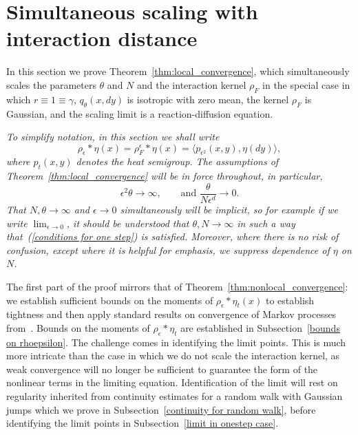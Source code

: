 \documentclass[12pt]{article}
\numberwithin{equation}{section}
\begin{document}
\section{Simultaneous scaling with interaction distance}
\label{subsec:one step convergence proof}

In this section we prove Theorem~\ref{thm:local_convergence},
which simultaneously scales the parameters $\theta$ and $N$ and the interaction 
kernel $\rho_F$ in the special case in which $r\equiv 1\equiv\gamma$, $q_{\theta}(x,dy)$
is isotropic with zero mean, the kernel
$\rho_F$ is Gaussian, and the scaling 
limit is a reaction-diffusion equation.

{\em To simplify notation, in this section we shall write 
$$\rho_\epsilon*\eta(x)=\rho_F^\epsilon*\eta(x)
=\langle p_{\epsilon^2}(x,y),\eta(dy)\rangle,$$
where $p_t(x,y)$ denotes the heat semigroup. 
The assumptions of Theorem~\ref{thm:local_convergence} will be in 
force throughout, in particular,
\begin{equation}
	\label{conditions for one step}
	\epsilon^2\theta\to\infty, \qquad\mbox{and }\frac{\theta}{N\epsilon^d}\to 0.
\end{equation}
That $N, \theta\to \infty$ and $\epsilon\to 0$ simultaneously will be 
implicit, so for example if we write $\lim_{\epsilon\to 0}$, it should be 
understood that $\theta, N\to\infty$ in such a way 
that~(\ref{conditions for one step}) is satisfied. 
Moreover, where there is no risk of confusion, except where it is helpful
for emphasis, we 
suppress dependence of $\eta$ on $N$.}

The first part of the proof mirrors that of Theorem~\ref{thm:nonlocal_convergence}:
we establish sufficient bounds on the moments of $\rho_\epsilon*\eta_t(x)$ to
establish tightness and then apply standard results on 
convergence of Markov processes from~\cite{ethier/kurtz:1986}. 
Bounds on the moments of $\rho_\epsilon*\eta_t$
are established in 
Subsection~\ref{bounds on rhoepsilon}.
The challenge
comes in identifying the limit points. This is much more intricate than the case in 
which we do not scale the interaction kernel, as weak convergence will no longer
be sufficient to guarantee the form of the nonlinear terms in the limiting equation.
Identification of the limit will rest on regularity inherited from continuity 
estimates for a random walk with Gaussian jumps which we prove in 
Subsection~\ref{continuity for random walk}, before
identifying the limit points in Subsection~\ref{limit in onestep case}.
\end{document}
